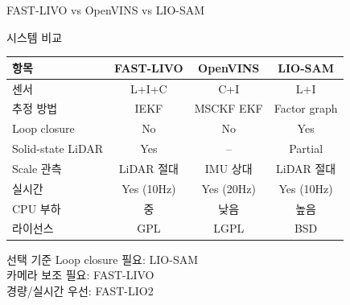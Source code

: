 \begin{frame}[shrink=10]{FAST-LIVO vs OpenVINS vs LIO-SAM}
  \begin{block}{시스템 비교}
    \begin{center}
      \begin{tabular}{lccc}
        \hline
        \textbf{항목} & \textbf{FAST-LIVO} & \textbf{OpenVINS} & \textbf{LIO-SAM} \\
        \hline
        센서 & L+I+C & C+I & L+I \\
        추정 방법 & IEKF & MSCKF EKF & Factor graph \\
        Loop closure & No & No & Yes \\
        Solid-state LiDAR & Yes & -- & Partial \\
        Scale 관측 & LiDAR 절대 & IMU 상대 & LiDAR 절대 \\
        실시간 & Yes (10Hz) & Yes (20Hz) & Yes (10Hz) \\
        CPU 부하 & 중 & 낮음 & 높음 \\
        라이선스 & GPL & LGPL & BSD \\
        \hline
      \end{tabular}
    \end{center}
  \end{block}
  \pause
  \begin{exampleblock}{선택 기준}
    Loop closure 필요: LIO-SAM\\
    카메라 보조 필요: FAST-LIVO\\
    경량/실시간 우선: FAST-LIO2
  \end{exampleblock}
\end{frame}

